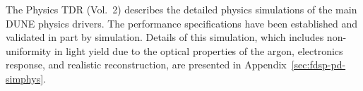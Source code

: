 
The Physics TDR (Vol.~2) describes the detailed physics simulations of the main DUNE physics drivers.  
The  performance specifications have been established and validated in part by simulation.  Details of this simulation, which includes non-uniformity in light yield due to the optical properties of the argon, electronics response, and realistic reconstruction, are presented in Appendix~\ref{sec:fdsp-pd-simphys}.



%
